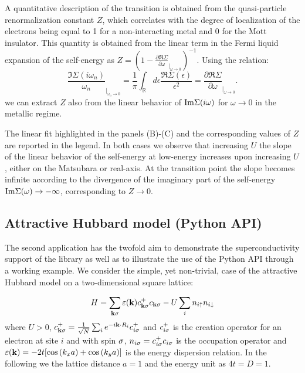A quantitative description of the transition is obtained from the
quasi-particle renormalization constant $Z$, which correlates with the degree of
localization of the electrons being equal to 1 for a non-interacting
metal and 0 for the Mott insulator. This quantity is obtained from the
linear term in the Fermi liquid expansion of the self-energy as
$Z=(1-\tfrac{\partial\Re\Sigma}{\partial\omega}_{|_{\omega\rightarrow
    0}})^{-1}$.
Using the relation:
$$
   \frac{\Im\Sigma(i\omega_n)}{\omega_n}_{|_{\omega_n\rightarrow 0}}=
   \frac{1}{\pi}\int_{\mathbb R}d\epsilon \frac{\Re\Sigma(\epsilon)}{\epsilon^2}=
   \frac{\partial\Re\Sigma}{\partial\omega}_{|_{\omega\rightarrow 0}}.
$$
we can extract $Z$ also from the linear behavior of ${\rm Im}\Sigma(i\omega)$ for 
$\omega\to0$ in the metallic regime.

The linear fit highlighted in the panels (B)-(C) and the corresponding values of $Z$ are reported in the legend.
In both cases we observe that increasing $U$ the slope of the linear behavior of the
self-energy at low-energy increases upon increasing $U$, either on the
Matsubara or real-axis. At the transition point the slope becomes
infinite according to the divergence of the imaginary part of
the self-energy  ${\rm Im}\Sigma(\omega) \rightarrow -\infty$,
corresponding to $Z\to 0$. 


\subsection{Attractive Hubbard model (Python API)}\label{SecExamplesAHM}
The second application has the twofold aim to demonstrate the
superconductivity support of the \NAME library as well as to
illustrate the use of the Python API through a working example.
We consider the simple, yet non-trivial, case of the attractive
Hubbard model on a two-dimensional square lattice:

$$
H = \sum_{{\bf k}\sigma} \varepsilon({\bf k})c^+_{{\bf k}\sigma}c_{{\bf k}\sigma} -U\sum_i n_{i\uparrow}n_{i\downarrow}
$$
where $U>0$, $c^+_{{\bf k}\sigma}=\tfrac{1}{\sqrt{N}}\sum_i e^{-i{\bf k}\cdot R_i} c^+_{i\sigma}$
and $c^+_{i\sigma}$ is the creation operator for an electron at site $i$
and with spin $\sigma$, $n_{i\sigma}=c^+_{i\sigma}c_{i\sigma}$ is the occupation
operator and $\varepsilon({\bf k})=-2t[\cos{(k_x a)}+ \cos{(k_y a)}]$ is the
energy dispersion relation. In the following we the lattice distance
$a=1$  and the energy unit as $4t=D=1$.

